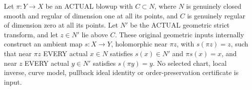 \begin{theorem}
\label{hir:sharp-actual-curve-strict-projection-local-inverse}
\leanok
Let $\pi:Y\to X$ be an ACTUAL blowup with $C\subset N$, where $N$
is genuinely closed smooth and regular of dimension one at all its
points, and $C$ is genuinely regular of dimension zero at all its points.
Let $N'$ be the ACTUAL geometric strict transform, and let $z\in N'$
lie above $C$. These original geometric inputs internally construct an
ambient map $s:X\to Y$, holomorphic near $\pi z$, with $s(\pi z)=z$,
such that near $\pi z$ EVERY actual $x\in N$ satisfies
$s(x)\in N'$ and $\pi s(x)=x$, and near $z$ EVERY actual $y\in N'$
satisfies $s(\pi y)=y$. No selected chart, local inverse, curve model,
pullback ideal identity or order-preservation certificate is input.
\end{theorem}
